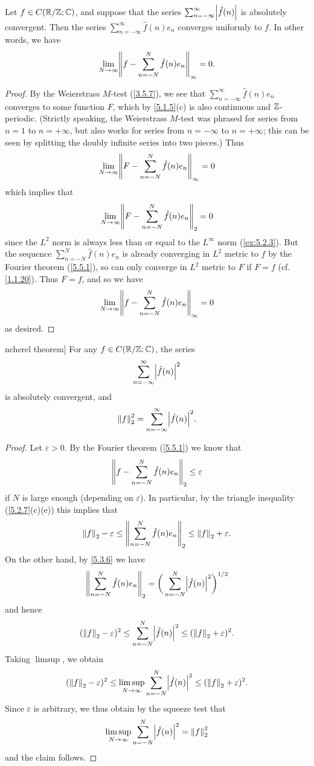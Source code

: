\begin{thm}\label{5.5.3}
  Let \(f \in C(\R / \Z ; \C)\), and suppose that the series \(\sum_{n = -\infty}^\infty \abs{\hat{f}(n)}\) is absolutely convergent.
  Then the series \(\sum_{n = -\infty}^\infty \hat{f}(n) e_n\) converges uniformly to \(f\).
  In other words, we have
  \[
    \lim_{N \to \infty} \norm*{f - \sum_{n = -N}^N \hat{f}(n) e_n}_{\infty} = 0.
  \]
\end{thm}

\begin{proof}
  By the Weierstrass \(M\)-test (\cref{3.5.7}), we see that \(\sum_{n = -\infty}^\infty \hat{f}(n) e_n\) converges to some function \(F\), which by \cref{5.1.5}(c) is also continuous and \(\Z\)-periodic.
  (Strictly speaking, the Weierstrass \(M\)-test was phrased for series from \(n = 1\) to \(n = +\infty\), but also works for series from \(n = -\infty\) to \(n = +\infty\);
  this can be seen by splitting the doubly infinite series into two pieces.)
  Thus
  \[
    \lim_{N \to \infty} \norm*{F - \sum_{n = -N}^N \hat{f}(n) e_n}_{\infty} = 0
  \]
  which implies that
  \[
    \lim_{N \to \infty} \norm*{F - \sum_{n = -N}^N \hat{f}(n) e_n}_2 = 0
  \]
  since the \(L^2\) norm is always less than or equal to the \(L^\infty\) norm (\cref{ex:5.2.3}).
  But the sequence \(\sum_{n = -N}^N \hat{f}(n) e_n\) is already converging in \(L^2\) metric to \(f\) by the Fourier theorem (\cref{5.5.1}), so can only converge in \(L^2\) metric to \(F\) if \(F = f\)
  (cf. \cref{1.1.20}).
  Thus \(F = f\), and so we have
  \[
    \lim_{N \to \infty} \norm*{f - \sum_{n = -N}^N \hat{f}(n) e_n}_{\infty} = 0
  \]
  as desired.
\end{proof}

\begin{thm}ncherel theorem]\label{5.5.4}
  For any \(f \in C(\R / \Z ; \C)\), the series
  \[
    \sum_{n = -\infty}^\infty \abs{\hat{f}(n)}^2
  \]
  is absolutely convergent, and
  \[
    \norm*{f}_2^2 = \sum_{n = -\infty}^\infty \abs{\hat{f}(n)}^2.
  \]
\end{thm}

\begin{proof}
  Let \(\varepsilon > 0\).
  By the Fourier theorem (\cref{5.5.1}) we know that
  \[
    \norm*{f - \sum_{n = -N}^N \hat{f}(n) e_n}_2 \leq \varepsilon
  \]
  if \(N\) is large enough (depending on \(\varepsilon\)).
  In particular, by the triangle inequality (\cref{5.2.7}(c)(e)) this implies that
  \[
    \norm*{f}_2 - \varepsilon \leq \norm*{\sum_{n = -N}^N \hat{f}(n) e_n}_2 \leq \norm*{f}_2 + \varepsilon.
  \]
  On the other hand, by \cref{5.3.6} we have
  \[
    \norm*{\sum_{n = -N}^N \hat{f}(n) e_n}_2 = \bigg(\sum_{n = -N}^N \abs{\hat{f}(n)}^2\bigg)^{1 / 2}
  \]
  and hence
  \[
    (\norm*{f}_2 - \varepsilon)^2 \leq \sum_{n = -N}^N \abs{\hat{f}(n)}^2 \leq (\norm*{f}_2 + \varepsilon)^2.
  \]
  Taking \(\limsup\), we obtain
  \[
    (\norm*{f}_2 - \varepsilon)^2 \leq \limsup_{N \to \infty} \sum_{n = -N}^N \abs{\hat{f}(n)}^2 \leq (\norm*{f}_2 + \varepsilon)^2.
  \]
  Since \(\varepsilon\) is arbitrary, we thus obtain by the squeeze test that
  \[
    \limsup_{N \to \infty} \sum_{n = -N}^N \abs{\hat{f}(n)}^2 = \norm*{f}_2^2
  \]
  and the claim follows.
\end{proof}

